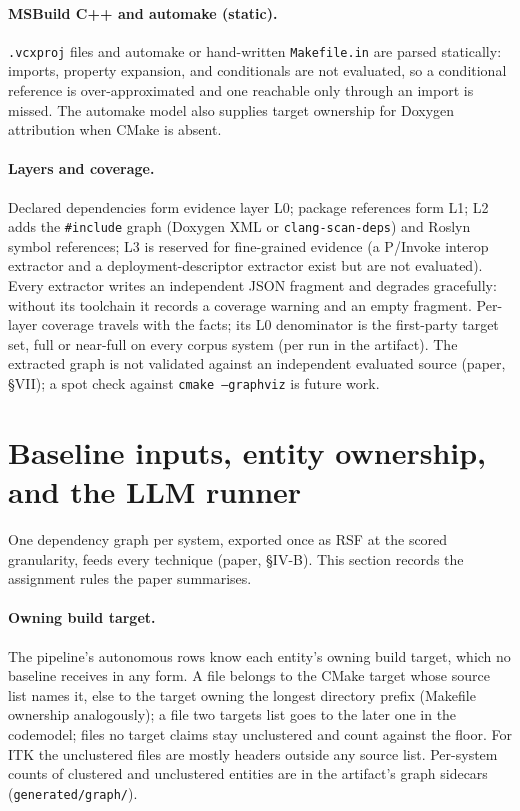 \documentclass[10pt,conference]{IEEEtran}
\begin{document}
\paragraph{MSBuild C++ and automake (static).} \texttt{.vcxproj} files and automake or
hand-written \texttt{Makefile.in} are parsed statically: imports, property expansion, and
conditionals are not evaluated, so a conditional reference is over-approximated and one reachable
only through an import is missed. The automake model also supplies target ownership for Doxygen
attribution when CMake is absent.

\paragraph{Layers and coverage.} Declared dependencies form evidence layer L0; package references
form L1; L2 adds the \texttt{\#include} graph (Doxygen XML or \texttt{clang-scan-deps}) and Roslyn
symbol references; L3 is reserved for fine-grained evidence (a P/Invoke interop extractor and a
deployment-descriptor extractor exist but are not evaluated). Every extractor writes an independent
JSON fragment and degrades gracefully: without its toolchain it records a coverage warning and an
empty fragment. Per-layer coverage travels with the facts; its L0 denominator is the first-party
target set, full or near-full on every corpus system (per run in the artifact). The extracted
graph is not validated against an independent evaluated source (paper, \S{}VII); a spot check
against \texttt{cmake --graphviz} is future work.

\section{Baseline inputs, entity ownership, and the LLM runner}
\label{sec:tr-inputs}

One dependency graph per system, exported once as RSF at the scored granularity, feeds every
technique (paper, \S{}IV-B). This section records the assignment rules the paper summarises.

\paragraph{Owning build target.} The pipeline's autonomous rows know each entity's owning build
target, which no baseline receives in any form. A file belongs to the CMake target whose source
list names it, else to the target owning the longest directory prefix (Makefile ownership
analogously); a file two targets list goes to the later one in the codemodel; files no target
claims stay unclustered and count against the floor. For ITK the unclustered files are mostly
headers outside any source list. Per-system counts of clustered and unclustered entities are in
the artifact's graph sidecars (\texttt{generated/graph/}).
\end{document}
